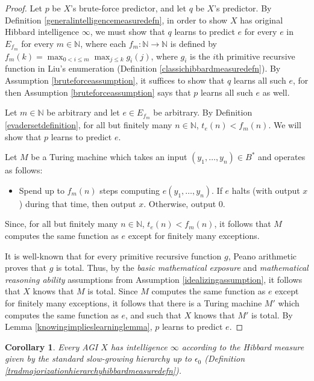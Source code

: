 \documentclass{article}
\newtheorem{corollary}[theorem]{Corollary}
\begin{document}
\begin{proof}
    Let $p$ be $X$'s brute-force predictor, and let $q$ be $X$'s predictor.
    By Definition \ref{generalintelligencemeasuredefn}, in order
    to show $X$ has original Hibbard intelligence $\infty$, we must
    show that $q$ learns to predict $e$ for every $e$ in $E_{f_m}$ for
    every $m\in\mathbb N$,
    where each $f_m:\mathbb N\to\mathbb N$ is defined by
    $f_m(k)=\max_{0<i\leq m}\max_{j\leq k}g_i(j)$,
    where $g_i$ is the $i$th primitive recursive function
    in Liu's enumeration
    (Definition \ref{classichibbardmeasuredefn}).
    By Assumption \ref{bruteforceassumption}, it suffices to show that
    $q$ learns all such $e$, for then Assumption \ref{bruteforceassumption}
    says that $p$ learns all such $e$ as well.

    Let $m\in\mathbb N$ be arbitrary and let $e\in E_{f_m}$ be arbitrary.
    By Definition \ref{evadersetdefinition},
    for all but finitely many $n\in\mathbb N$, $t_e(n)<f_m(n)$.
    We will show that $p$ learns to predict $e$.

    Let $M$ be a Turing machine which takes an input
    $(y_1,\ldots,y_n)\in B^*$ and
    operates as follows:
    \begin{itemize}
        \item
        Spend up to $f_m(n)$ steps computing $e(y_1,\ldots,y_n)$.
        If $e$ halts (with output $x$) during that time, then output $x$.
        Otherwise, output $0$.
    \end{itemize}
    Since, for all but finitely many $n\in\mathbb N$, $t_e(n)<f_m(n)$,
    it follows that $M$ computes the same function as $e$ except for finitely
    many exceptions.

    It is well-known that for every primitive recursive function $g$, Peano
    arithmetic proves that $g$ is total. Thus, by the \emph{basic mathematical
    exposure} and \emph{mathematical reasoning ability} assumptions from
    Assumption \ref{idealizingassumption}, it follows that $X$ knows that
    $M$ is total. Since $M$ computes the same function as $e$ except for
    finitely many exceptions, it follows that there is a Turing machine $M'$
    which computes the same function as $e$, and such that $X$
    knows that $M'$ is total. By Lemma \ref{knowingimplieslearninglemma},
    $p$ learns to predict $e$.
\end{proof}

\begin{corollary}
\label{trivialityofslowgrowinghierarchycorollary}
    Every AGI $X$ has intelligence $\infty$ according to
    the Hibbard measure given by the standard slow-growing hierarchy
    up to $\epsilon_0$
    (Definition \ref{tradmajorizationhierarchyhibbardmeasuredefn}).
\end{corollary}
\end{document}
